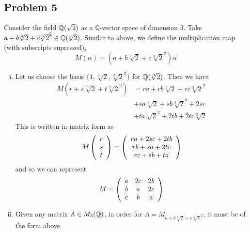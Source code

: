 \documentclass{../../mathnotes}
\begin{document}
\subsection*{Problem 5}

Consider the field $\mathbb{Q}(\sqrt{2})$ as a $\mathbb{Q}$-vector space of dimension 3. Take $a+b\sqrt[3]{2}+c\sqrt[3]{2}^2\in\mathbb{Q}(\sqrt{2})$.
Similar to above, we define the multiplication map (with subscripts supressed),
\[M(\alpha)=\left( a+b\sqrt[3]{2}+c\sqrt[3]{2}^2 \right)\alpha\]

\begin{enumerate}[(i)]
    \item Let us choose the basis $\{ 1,\sqrt[3]{2},\sqrt[3]{2}^2 \}$ for $\mathbb{Q}(\sqrt[3]{2})$. Then we have
        \begin{align*}
            M(r+s\sqrt[3]{2}+t\sqrt[3]{2}^2)&=ra+rb\sqrt[3]{2}+rc\sqrt[3]{2}^2\\
            &+sa\sqrt[3]{2}+sb\sqrt[3]{2}^2+2sc\\
            &+ta\sqrt[3]{2}^2+2tb+2tc\sqrt[3]{2}
        \end{align*}
        This is written in matrix form as
        \begin{align*}
            M\left( 
            \begin{array}[]{c}
                r\\
                s\\
                t
            \end{array}
            \right)
            =
            \left( 
            \begin{array}[]{c}
                ra+2sc+2tb\\
                rb+sa+2tc\\
                rc+sb+ta
            \end{array}
            \right)
        \end{align*}
        and so we can represent
        \begin{align*}
            M=\left( 
            \begin{array}[]{ccc}
                a & 2c & 2b\\
                b & a & 2c\\
                c & b & a
            \end{array}
            \right)
        \end{align*}
    \item Given any matrix $A\in M_3(\mathbb{Q})$, in order for $A=M_{a+b\sqrt[3]{2}+c\sqrt[3]{2}^2}$, it must be of the form above

\end{enumerate}
\end{document}
